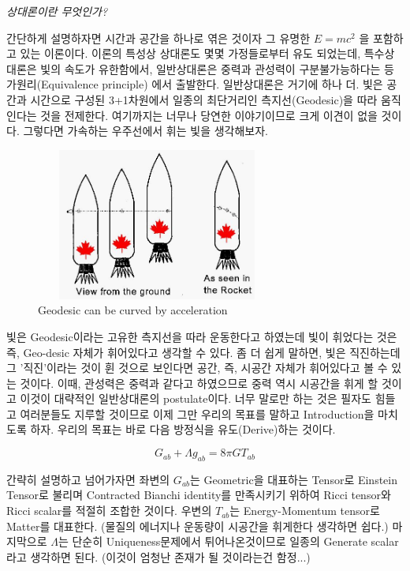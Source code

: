 \documentclass[paper=a4, fontsize=11pt]{scrartcl} %
\numberwithin{equation}{section} %
\numberwithin{figure}{section} %
\numberwithin{table}{section} %
\theoremstyle{plain}
\begin{document}
 \vspace{0.3cm}
 
 \emph{상대론이란 무엇인가?}
 
 \vspace{0.3cm}
 
 간단하게 설명하자면 시간과 공간을 하나로 엮은 것이자 그 유명한 $E=mc^2$ 을 포함하고 있는 이론이다. 이론의 특성상 상대론도 몇몇 가정들로부터 유도 되었는데, 특수상대론은 빛의 속도가 유한함에서, 일반상대론은 중력과 관성력이 구분불가능하다는 등가원리(Equivalence principle)
 에서 출발한다. 일반상대론은 거기에 하나 더. 빛은 공간과 시간으로 구성된 3+1차원에서 일종의 최단거리인 측지선(Geodesic)을 따라 움직인다는 것을 전제한다.\footnotemark
 여기까지는 너무나 당연한 이야기이므로 크게 이견이 없을 것이다. 그렇다면 가속하는 우주선에서 휘는 빛을 생각해보자.
 
 \begin{figure}[h]
  \centering
  \includegraphics[width=8cm, height=5cm]{relgen3.jpg}
  \caption{Geodesic can be curved by acceleration}
  \label{fig:rocket}
 \end{figure}

 빛은 Geodesic이라는 고유한 측지선을 따라 운동한다고 하였는데 빛이 휘었다는 것은 즉, Geo-desic 자체가 휘어있다고 생각할 수 있다. 좀 더 쉽게 말하면, 빛은 직진하는데 그 '직진'이라는 것이 휜 것으로 보인다면 공간, 즉, 시공간
 자체가 휘어있다고 볼 수 있는 것이다. 이때, 관성력은 중력과 같다고 하였으므로 중력 역시 시공간을 휘게 할 것이고 이것이 대략적인 일반상대론의 postulate이다. 너무 말로만 하는 것은 필자도 힘들고 여러분들도 지루할 것이므로 
 이제 그만 우리의 목표를 말하고 Introduction을 마치도록 하자. 우리의 목표는 바로 다음 방정식을 유도(Derive)하는 것이다.
 
 \begin{equation}
  G_{ab} + \Lambda g_{ab} = 8\pi G T_{ab}
 \end{equation}

 간략히 설명하고 넘어가자면 좌변의 $G_{ab}$는 Geometric을 대표하는 Tensor로 Einstein Tensor로 불리며 Contracted Bianchi identity를 만족시키기 위하여 Ricci tensor와 Ricci scalar를 
 적절히 조합한 것이다. 우변의 $T_{ab}$는 Energy-Momentum tensor로 Matter를 대표한다. (물질의 에너지나 운동량이 시공간을 휘게한다 생각하면 쉽다.) 마지막으로 $\Lambda$는 단순히 Uniqueness문제에서 
 튀어나온것이므로 일종의 Generate scalar라고 생각하면 된다. (이것이 엄청난 존재가 될 것이라는건 함정...)
\end{document}
